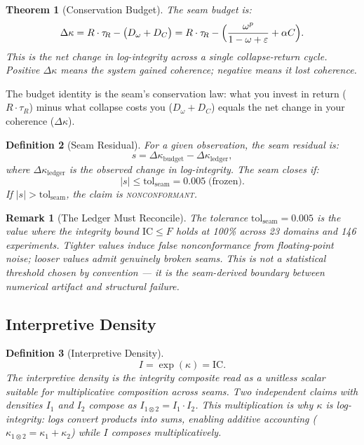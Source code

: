 \documentclass[
  aps,
  prd,
  preprint,
  superscriptaddress,
  nofootinbib,
  floatfix,
  longbibliography
]{revtex4-2}
\newtheorem{theorem}{Theorem}
\newtheorem{definition}[theorem]{Definition}
\newtheorem{remark}{Remark}
\newcommand{\tR}{\tau_{\!R}}
\newcommand{\eps}{\varepsilon}
\newcommand{\tolseam}{\mathrm{tol}_{\mathrm{seam}}}
\newcommand{\beq}{\begin{equation}}
\newcommand{\eeq}{\end{equation}}
\newcommand{\regime}[1]{\textrm{\upshape\scshape#1}}
\newcommand{\nonconform}{\regime{nonconformant}}
\newcommand{\IC}{\mathrm{IC}}
\newcommand{\Fid}{F}
\newcommand{\Drft}{\omega}
\newcommand{\Curv}{C}
\newcommand{\Logint}{\kappa}
\begin{document}
\begin{theorem}[Conservation Budget]\label{thm:budget}
The seam budget is:
\beq\label{eq:budget}
  \Delta\Logint = R \cdot \tR
    - \bigl(D_\Drft + D_\Curv\bigr)
  = R \cdot \tR
    - \Bigl(\frac{\Drft^p}{1 - \Drft + \eps} + \alpha \Curv\Bigr).
\eeq
This is the net change in log-integrity across a single
collapse-return cycle.
Positive $\Delta\Logint$ means the system gained coherence;
negative means it lost coherence.
\end{theorem}

The budget identity is the seam's conservation law:
what you invest in return ($R \cdot \tR$) minus
what collapse costs you ($D_\Drft + D_\Curv$) equals
the net change in your coherence ($\Delta\Logint$).

\begin{definition}[Seam Residual]\label{def:residual}
For a given observation, the seam residual is:
\beq
  s = \Delta\Logint_{\mathrm{budget}}
    - \Delta\Logint_{\mathrm{ledger}},
\eeq
where $\Delta\Logint_{\mathrm{ledger}}$ is the observed
change in log-integrity.
The seam closes if:
\beq
  |s| \leq \tolseam = 0.005 \;\text{(frozen)}.
\eeq
If $|s| > \tolseam$, the claim is \nonconform{}.
\end{definition}

\begin{remark}[The Ledger Must Reconcile]
The tolerance $\tolseam = 0.005$ is the value where the
integrity bound $\IC \leq \Fid$ holds at 100\%
across 23 domains and 146 experiments.
Tighter values induce false nonconformance from
floating-point noise; looser values admit genuinely
broken seams.
This is not a statistical threshold chosen by convention
— it is the seam-derived boundary between numerical
artifact and structural failure.
\end{remark}

\subsection{Interpretive Density}

\begin{definition}[Interpretive Density]\label{def:I}
\beq
  I = \exp(\Logint) = \IC.
\eeq
The interpretive density is the integrity composite read
as a unitless scalar suitable for multiplicative
composition across seams.
Two independent claims with densities $I_1$ and $I_2$
compose as $I_{1 \otimes 2} = I_1 \cdot I_2$.
This multiplication is why $\Logint$ is
\emph{log}-integrity: logs convert products into sums,
enabling additive accounting ($\Logint_{1 \otimes 2}
= \Logint_1 + \Logint_2$) while $I$ composes
multiplicatively.
\end{definition}
\end{document}
